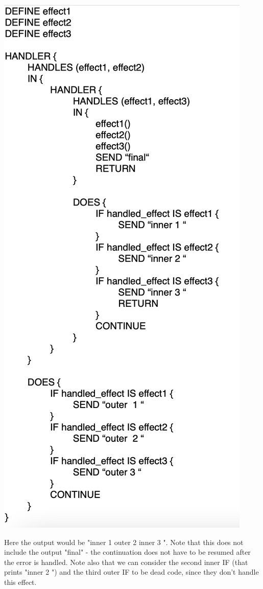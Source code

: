 \documentclass{article}
\begin{document}
\includegraphics[scale=0.4]{pseudocode handler.png}

Here the output would be "inner 1 outer 2 inner 3 ". Note that this does not include the output "final" - the continuation does not have to be resumed after the error is handled. Note also that we can consider the second inner IF (that prints "inner 2 ") and the third outer IF to be dead code, since they don't handle this effect.
\end{document}
